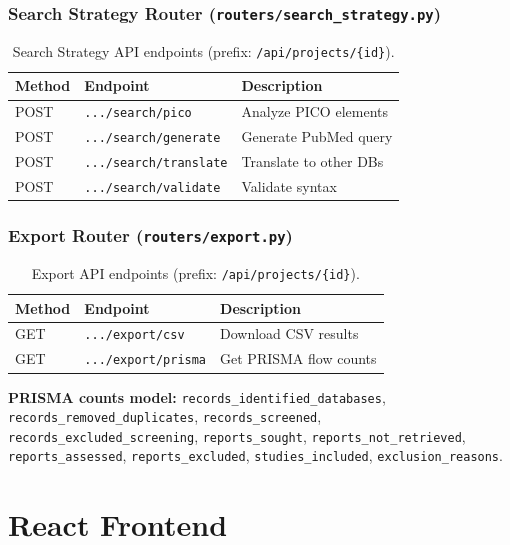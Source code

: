 \documentclass[11pt,a4paper]{article}
\begin{document}
\subsubsection{Search Strategy Router (\texttt{routers/search\_strategy.py})}

\begin{table}[H]
\centering\small
\begin{tabular}{llp{4cm}}
\toprule
\textbf{Method} & \textbf{Endpoint} & \textbf{Description} \\
\midrule
POST & \texttt{.../search/pico} & Analyze PICO elements \\
POST & \texttt{.../search/generate} & Generate PubMed query \\
POST & \texttt{.../search/translate} & Translate to other DBs \\
POST & \texttt{.../search/validate} & Validate syntax \\
\bottomrule
\end{tabular}
\caption{Search Strategy API endpoints (prefix: \texttt{/api/projects/\{id\}}).}
\end{table}

\subsubsection{Export Router (\texttt{routers/export.py})}

\begin{table}[H]
\centering\small
\begin{tabular}{llp{5cm}}
\toprule
\textbf{Method} & \textbf{Endpoint} & \textbf{Description} \\
\midrule
GET & \texttt{.../export/csv} & Download CSV results \\
GET & \texttt{.../export/prisma} & Get PRISMA flow counts \\
\bottomrule
\end{tabular}
\caption{Export API endpoints (prefix: \texttt{/api/projects/\{id\}}).}
\end{table}

\textbf{PRISMA counts model:} \texttt{records\_identified\_databases}, \texttt{records\_removed\_duplicates}, \texttt{records\_screened}, \texttt{records\_excluded\_screening}, \texttt{reports\_sought}, \texttt{reports\_not\_retrieved}, \texttt{reports\_assessed}, \texttt{reports\_excluded}, \texttt{studies\_included}, \texttt{exclusion\_reasons}.

\section{React Frontend}
\end{document}
